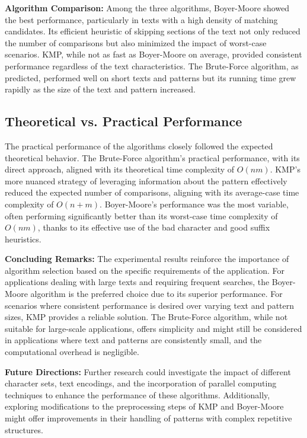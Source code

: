 \documentclass{article}
\begin{document}
\textbf{Algorithm Comparison:}
Among the three algorithms, Boyer-Moore showed the best performance, particularly in texts with a high density of matching candidates. Its efficient heuristic of skipping sections of the text not only reduced the number of comparisons but also minimized the impact of worst-case scenarios. KMP, while not as fast as Boyer-Moore on average, provided consistent performance regardless of the text characteristics. The Brute-Force algorithm, as predicted, performed well on short texts and patterns but its running time grew rapidly as the size of the text and pattern increased.

\subsection{Theoretical vs. Practical Performance}

The practical performance of the algorithms closely followed the expected theoretical behavior. The Brute-Force algorithm's practical performance, with its direct approach, aligned with its theoretical time complexity of $O(nm)$. KMP's more nuanced strategy of leveraging information about the pattern effectively reduced the expected number of comparisons, aligning with its average-case time complexity of $O(n+m)$. Boyer-Moore's performance was the most variable, often performing significantly better than its worst-case time complexity of $O(nm)$, thanks to its effective use of the bad character and good suffix heuristics.

\textbf{Concluding Remarks:}
The experimental results reinforce the importance of algorithm selection based on the specific requirements of the application. For applications dealing with large texts and requiring frequent searches, the Boyer-Moore algorithm is the preferred choice due to its superior performance. For scenarios where consistent performance is desired over varying text and pattern sizes, KMP provides a reliable solution. The Brute-Force algorithm, while not suitable for large-scale applications, offers simplicity and might still be considered in applications where text and patterns are consistently small, and the computational overhead is negligible.

\textbf{Future Directions:}
Further research could investigate the impact of different character sets, text encodings, and the incorporation of parallel computing techniques to enhance the performance of these algorithms. Additionally, exploring modifications to the preprocessing steps of KMP and Boyer-Moore might offer improvements in their handling of patterns with complex repetitive structures.
\end{document}
